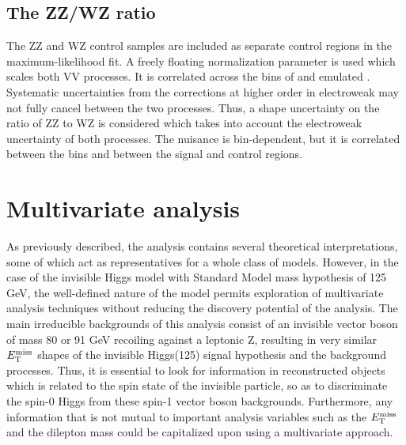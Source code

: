 \subsection{The ZZ/WZ ratio}

The ZZ and WZ control samples are included as separate control regions in the maximum-likelihood fit.
A freely floating normalization parameter is used which scales both VV processes. It is correlated across the bins of \met and emulated \met.
Systematic uncertainties from the corrections at higher order in electroweak may not fully cancel between the two processes.
Thus, a shape uncertainty on the ratio of ZZ to WZ is considered which takes into account the electroweak uncertainty of both processes.
The nuisance is bin-dependent, but it is correlated between the \met bins and between the signal and control regions.

\section{Multivariate analysis}
\label{sec:dmmva}
As previously described, the analysis contains several theoretical interpretations, some of which act as representatives for a whole class of models.
However, in the case of the invisible Higgs model with Standard Model mass hypothesis of 125 GeV,
the well-defined nature of the model permits exploration of multivariate analysis techniques without reducing the discovery potential of the analysis.
The main irreducible backgrounds of this analysis consist of an invisible vector boson of mass 80 or 91 GeV recoiling against a leptonic Z, resulting in very similar 
$E_\mathrm{T}^{\mathrm{miss}}$ shapes of the invisible Higgs(125) signal hypothesis and the background processes.
Thus, it is essential to look for information in reconstructed objects
which is related to the spin state of the invisible particle, so as to discriminate the spin-0 Higgs from these spin-1 vector boson backgrounds.
Furthermore, any information that is not mutual to important analysis variables such as the $E_\mathrm{T}^{\mathrm{miss}}$ and the dilepton mass could be capitalized upon using a multivariate approach.

